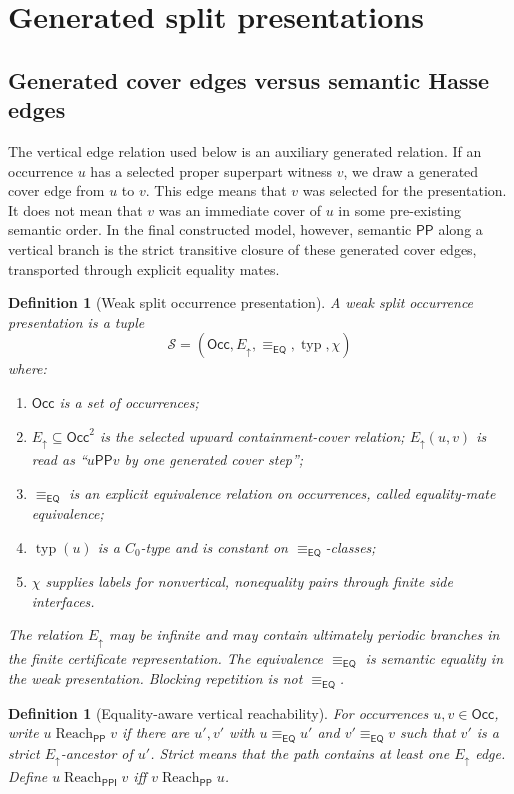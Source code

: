 \documentclass[11pt]{article}
\newtheorem{definition}[theorem]{Definition}
\newcommand{\EQ}{\mathsf{EQ}}
\newcommand{\PP}{\mathsf{PP}}
\newcommand{\PPI}{\mathsf{PPI}}
\newcommand{\Occ}{\mathsf{Occ}}
\newcommand{\typ}{\operatorname{typ}}
\newcommand{\eqc}{\equiv_{\EQ}}
\newcommand{\reach}{\operatorname{Reach}}
\begin{document}
\section{Generated split presentations}

\subsection{Generated cover edges versus semantic Hasse edges}

The vertical edge relation used below is an auxiliary generated relation.  If an occurrence $u$ has a selected proper superpart witness $v$, we draw a generated cover edge from $u$ to $v$.  This edge means that $v$ was selected for the presentation.  It does not mean that $v$ was an immediate cover of $u$ in some pre-existing semantic order.  In the final constructed model, however, semantic $\PP$ along a vertical branch is the strict transitive closure of these generated cover edges, transported through explicit equality mates.

\begin{definition}[Weak split occurrence presentation]\label{def:weak-presentation}
A weak split occurrence presentation is a tuple
\[
  \mathcal S=(\Occ,E_\uparrow,\eqc,\typ,\chi)
\]
where:
\begin{enumerate}[label=(S\arabic*)]
\item $\Occ$ is a set of occurrences;
\item $E_\uparrow\subseteq\Occ^2$ is the selected upward containment-cover relation; $E_\uparrow(u,v)$ is read as ``$u\PP v$ by one generated cover step'';
\item $\eqc$ is an explicit equivalence relation on occurrences, called equality-mate equivalence;
\item $\typ(u)$ is a $C_0$-type and is constant on $\eqc$-classes;
\item $\chi$ supplies labels for nonvertical, nonequality pairs through finite side interfaces.
\end{enumerate}
The relation $E_\uparrow$ may be infinite and may contain ultimately periodic branches in the finite certificate representation.  The equivalence $\eqc$ is semantic equality in the weak presentation.  Blocking repetition is not $\eqc$.
\end{definition}

\begin{definition}[Equality-aware vertical reachability]\label{def:eq-aware-vertical}
For occurrences $u,v\in\Occ$, write $u\reach_\PP v$ if there are $u',v'$ with $u\eqc u'$ and $v'\eqc v$ such that $v'$ is a strict $E_\uparrow$-ancestor of $u'$.  Strict means that the path contains at least one $E_\uparrow$ edge.  Define $u\reach_\PPI v$ iff $v\reach_\PP u$.
\end{definition}
\end{document}
